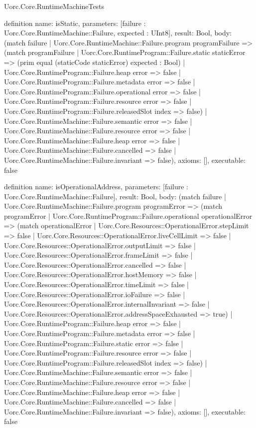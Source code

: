 \begin{lexlean}{Uorc.Core.RuntimeMachineTests}
\begin{semanticmodule}
definition{
  name: isStatic,
  parameters: [failure : Uorc.Core.RuntimeMachine::Failure, expected : UInt8],
  result: Bool,
  body: (match failure
    | Uorc.Core.RuntimeMachine::Failure.program programFailure => (match programFailure
      | Uorc.Core.RuntimeProgram::Failure.static staticError => (prim equal (staticCode staticError) expected : Bool)
      | Uorc.Core.RuntimeProgram::Failure.heap error => false
      | Uorc.Core.RuntimeProgram::Failure.metadata error => false
      | Uorc.Core.RuntimeProgram::Failure.operational error => false
      | Uorc.Core.RuntimeProgram::Failure.resource error => false
      | Uorc.Core.RuntimeProgram::Failure.releasedSlot index => false)
    | Uorc.Core.RuntimeMachine::Failure.semantic error => false
    | Uorc.Core.RuntimeMachine::Failure.resource error => false
    | Uorc.Core.RuntimeMachine::Failure.heap error => false
    | Uorc.Core.RuntimeMachine::Failure.cancelled => false
    | Uorc.Core.RuntimeMachine::Failure.invariant => false),
  axioms: [],
  executable: false
}

definition{
  name: isOperationalAddress,
  parameters: [failure : Uorc.Core.RuntimeMachine::Failure],
  result: Bool,
  body: (match failure
    | Uorc.Core.RuntimeMachine::Failure.program programError => (match programError
      | Uorc.Core.RuntimeProgram::Failure.operational operationalError => (match operationalError
        | Uorc.Core.Resources::OperationalError.stepLimit => false
        | Uorc.Core.Resources::OperationalError.liveCellLimit => false
        | Uorc.Core.Resources::OperationalError.outputLimit => false
        | Uorc.Core.Resources::OperationalError.frameLimit => false
        | Uorc.Core.Resources::OperationalError.cancelled => false
        | Uorc.Core.Resources::OperationalError.hostMemory => false
        | Uorc.Core.Resources::OperationalError.timeLimit => false
        | Uorc.Core.Resources::OperationalError.ioFailure => false
        | Uorc.Core.Resources::OperationalError.internalInvariant => false
        | Uorc.Core.Resources::OperationalError.addressSpaceExhausted => true)
      | Uorc.Core.RuntimeProgram::Failure.heap error => false
      | Uorc.Core.RuntimeProgram::Failure.metadata error => false
      | Uorc.Core.RuntimeProgram::Failure.static error => false
      | Uorc.Core.RuntimeProgram::Failure.resource error => false
      | Uorc.Core.RuntimeProgram::Failure.releasedSlot index => false)
    | Uorc.Core.RuntimeMachine::Failure.semantic error => false
    | Uorc.Core.RuntimeMachine::Failure.resource error => false
    | Uorc.Core.RuntimeMachine::Failure.heap error => false
    | Uorc.Core.RuntimeMachine::Failure.cancelled => false
    | Uorc.Core.RuntimeMachine::Failure.invariant => false),
  axioms: [],
  executable: false
}


\end{semanticmodule}
\end{lexlean}
